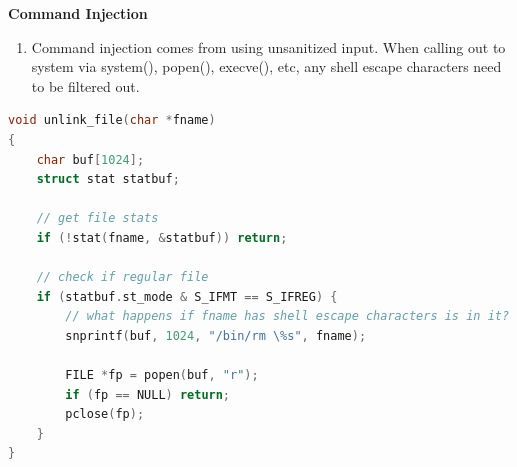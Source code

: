 \documentclass[12pt]{Training}
\begin{document}
\textbf{Command Injection}
\begin{enumerate}
    \item Command injection comes from using unsanitized input. When calling out to system via system(), popen(), execve(), etc, any shell escape characters need to be filtered out.
\end{enumerate}
\begin{sectionbox}
\begin{lstlisting}[language=C, caption={Command Injection}]
void unlink_file(char *fname)
{
    char buf[1024];
    struct stat statbuf;

    // get file stats
    if (!stat(fname, &statbuf)) return;

    // check if regular file
    if (statbuf.st_mode & S_IFMT == S_IFREG) {
        // what happens if fname has shell escape characters is in it?
        snprintf(buf, 1024, "/bin/rm \%s", fname);

        FILE *fp = popen(buf, "r");
        if (fp == NULL) return;
        pclose(fp);
    }
}
\end{lstlisting}
\end{sectionbox}
\end{document}
